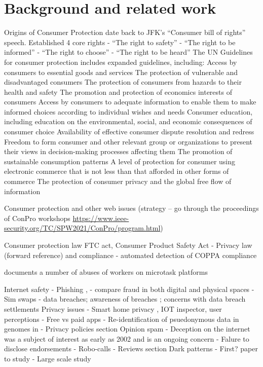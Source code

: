 \chapter{Background and related work} \label{ch:background}

Origins of Consumer Protection date back to JFK's ``Consumer bill of rights'' speech. Established 4 core rights \cite{kennedy1962special}
- ``The right to safety''
- ``The right to be informed''
- ``The right to choose''
- ``The right to be heard''
The UN Guidelines for consumer protection includes expanded guidelines, including: \cite{un2003conpro}
Access by consumers to essential goods and services
The protection of vulnerable and disadvantaged consumers
The protection of consumers from hazards to their health and safety
The promotion and protection of economics interests of consumers
Access by consumers to adequate information to enable them to make informed choices  according to individual wishes and needs
Consumer education, including education on the environmental, social, and economic consequences of consumer choice
Availability of effective consumer dispute resolution and redress
Freedom to form consumer and other relevant group or organizations to present their views in decision-making processes affecting them
The promotion of sustainable consumption patterns
A level of protection for consumer using electronic commerce that is not less than that afforded in other forms of commerce
The protection of consumer privacy and the global free flow of information


Consumer protection and other web issues
(strategy -- go through the proceedings of ConPro workshops \url{https://www.ieee-security.org/TC/SPW2021/ConPro/program.html})

Consumer protection law
FTC act, Consumer Product Safety Act
- Privacy law (forward reference) and compliance
    - \cite{reyes2018won} automated detection of COPPA compliance

\cite{yeung2021Bad} documents a number of abuses of workers on microtask platforms



Internet safety
- Phishing \cite{hong2012state}, 
- \cite{khan2017old} compare fraud in both digital and physical spaces
- Sim swaps \cite{lee2020empirical}
- data breaches; awareness of breaches \cite{bhagavatula2021breach}; concerns with data breach settlements \cite{amos2019enhancing}
Privacy issues
- Smart home privacy \cite{apthorpe2019evaluating},  IOT inspector\cite{huang2020iot}, user perceptions \cite{zheng2018user}
- Free vs paid apps \cite{bamberger2020can}
- Re-identification of psuedonymous data in genomes \cite{malin2004not} in 
- Privacy policies section 
Opinion spam
- Deception on the internet was a subject of interest as early as 2002 \cite{forbes2002web} and is an ongoing concern \cite{zeng2020bad} \cite{hounsel2020identifying}
- Falure to disclose endorsements \cite{mathur2018endorsements}
- Robo-calls \cite{azad2020socioscope}
- Reviews section
Dark patterns
- First? paper to study \cite{gray2018dark}
- Large scale study \cite{mathur2019dark}